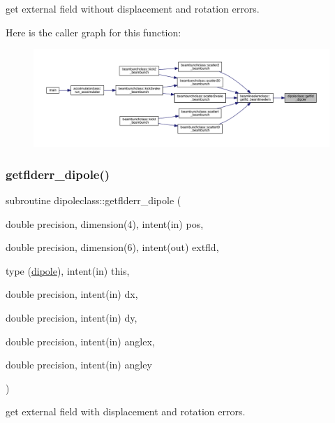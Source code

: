 get external field without displacement and rotation errors. 

Here is the caller graph for this function\+:\nopagebreak
\begin{figure}[H]
\begin{center}
\leavevmode
\includegraphics[width=350pt]{namespacedipoleclass_ac8c755e07904e113f223ee5ef029ac93_icgraph}
\end{center}
\end{figure}
\mbox{\label{namespacedipoleclass_a0a75204835a2e4dd1ea67c1ee32e62fe}} 
\subsubsection{\texorpdfstring{getflderr\_dipole()}{getflderr\_dipole()}}
{\footnotesize\ttfamily subroutine dipoleclass\+::getflderr\+\_\+dipole (\begin{DoxyParamCaption}\item[{double precision, dimension(4), intent(in)}]{pos,  }\item[{double precision, dimension(6), intent(out)}]{extfld,  }\item[{type (\mbox{\hyperlink{namespacedipoleclass_structdipoleclass_1_1dipole}{dipole}}), intent(in)}]{this,  }\item[{double precision, intent(in)}]{dx,  }\item[{double precision, intent(in)}]{dy,  }\item[{double precision, intent(in)}]{anglex,  }\item[{double precision, intent(in)}]{angley }\end{DoxyParamCaption})}



get external field with displacement and rotation errors. 

